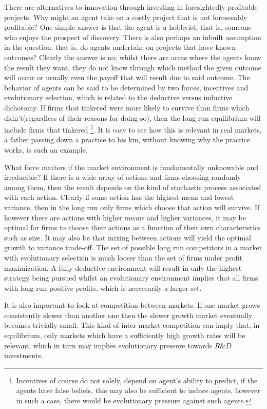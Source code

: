 \documentclass[12pt]{report}
\numberwithin{equation}{section}
\begin{document}
There are alternatives to innovation through investing in foresightedly profitable projects. Why might an agent take on a costly project that is not foreseeably profitable? One simple answer is that the agent is a hobbyist, that is, someone who enjoys the prospect of discovery. There is also perhaps an inbuilt assumption in the question, that is, do agents undertake on projects that have known outcomes? Clearly the answer is no; whilst there are areas where the agents know the result they want, they do not know through which method the given outcome will occur or usually even the payoff that will result due to said outcome. The behavior of agents can be said to be determined by two forces, incentives and evolutionary selection, which is related to the deductive versus inductive dichotomy. If firms that tinkered were more likely to survive than firms which didn't(regardless of their reasons for doing so), then the long run equilibrium will include firms that tinkered \footnote{Incentives of course do not solely, depend on agent’s  ability to predict, if the agents have false beliefs, this may also be sufficient to induce agents, however in such a case, there would be evolutionary pressure against such agents.}. It is easy to see how this is relevant in real markets, a father passing down a practice to his kin, without knowing why the practice works, is such an example. 


What force matters if the market environment is fundamentally unknowable and irreducible? If there is a wide array of actions and firms choosing randomly among them, then the result depends on the kind of stochastic process associated with each action. Clearly if some action has the highest mean and lowest variance, then in the long run only firms which choose that action will survive\cite{alchian1950uncertainty}. If however there are actions with higher means and higher variances, it may be optimal for firms to choose their actions as a function of their own characteristics such as size. It may also be that mixing between actions will yield the optimal growth to variance trade-off. The set of possible long run competitors in a market with evolutionary selection is much looser than the set of firms under profit maximization. A fully deductive environment will result in only the highest strategy being pursued whilst an evolutionary environment implies that all firms with long run positive profits, which is neccesarily a larger set. 

It is also important to look at competition between markets. If one market grows consistently slower than another one then the slower growth market eventually becomes trivially small. This kind of inter-market competition can imply that, in equilibrium, only markets which have a sufficiently high growth rates will be relevant, which in turn may implies evolutionary pressure towards $R\&D$ investments. 
\end{document}

